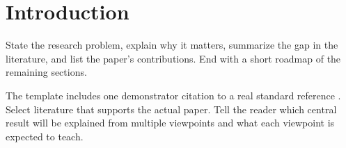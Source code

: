 \section{Introduction}
\label{sec:introduction}

State the research problem, explain why it matters, summarize the gap in the
literature, and list the paper's contributions. End with a short roadmap of the
remaining sections.

The template includes one demonstrator citation to a real standard reference
\cite{boyd2004}. Select literature that supports the actual paper.
Tell the reader which central result will be explained from multiple
viewpoints and what each viewpoint is expected to teach.
